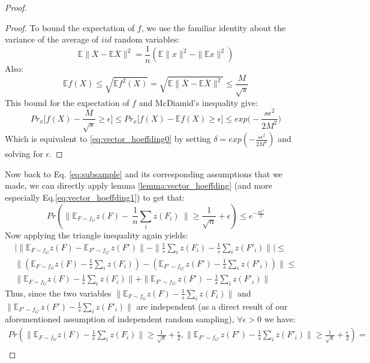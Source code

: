 \begin{proof}
\begin{proof}
To bound the expectation of $f$, we use the familiar identity about the variance of the average of $iid$ random variables:
\begin{equation}
\mathbb{E}\|\overline{X}-\mathbb{E}\overline{X}\|^2=\frac{1}{n}(\mathbb{E}\|x\|^2-\|\mathbb{E}x\|^2 ) 
\end{equation}
Also:
\[ \mathbb{E}f(X)\leq\sqrt{\mathbb{E}f^2(X)}=\sqrt{\mathbb{E}\|\overline{X}-\mathbb{E}\overline{X}\|^2}\leq \frac{M}{\sqrt{{s}}}\]
This bound for the expectation of $f$ and McDiamid's inequality give: 
\begin{equation}
\label{eq:vector_hoeffding1}
    Pr_x \Big [ f(X)-\frac{M}{\sqrt{{s}}}\geq \epsilon \Big ]\leq
    Pr_x \Big [ f(X)-\mathbb{E}f(X)\geq \epsilon \Big ]\leq
    exp\Big( -\frac{{s}\epsilon^2}{2M^2}\Big)
\end{equation}
Which is equivalent to \eqref{eq:vector_hoeffding0} by setting $\delta=exp( -\frac{{s}\epsilon^2}{2M^2})$ and solving for $\epsilon$.
\end{proof}
Now back to Eq. \eqref{eq:subsample} and its corresponding assumptions that we made, we can directly apply lemma \ref{lemma:vector_hoeffding} (and more especially Eq.\eqref{eq:vector_hoeffding1}) to get that:
\begin{equation}
    \label{eq:fixed_w}
    Pr(\|\mathbb{E}_{F \sim f_G} z(F)-~\frac{1}{n} \sum_i z(F_i)~\|\geq \frac{1}{\sqrt{n}}+\epsilon)\leq
    e^{-\frac{n\epsilon^2}{2}}
\end{equation}
Now applying the triangle inequality again yields:
\begin{align*}
    \Big | \| \mathbb{E}_{F \sim f_G} z(F) - \mathbb{E}_{F' \sim f_{G'}} z(F')\| - \| \frac{1}{{s}} \sum_i z(F_i) - \frac{1}{{s}} \sum_i z(F'_i)\|\Big | \leq  \\
   \| (\mathbb{E}_{F \sim f_G} z(F) -  \frac{1}{{s}} \sum_i z(F_i) )- (\mathbb{E}_{F' \sim f_{G'}} z(F') - \frac{1}{{s}} \sum_i z(F'_i))\|\leq \\
    \| \mathbb{E}_{F \sim f_G} z(F) -  \frac{1}{{s}} \sum_i z(F_i) \|+ \|\mathbb{E}_{F' \sim f_{G'}} z(F') - \frac{1}{{s}} \sum_i z(F'_i)\|
\end{align*}
Thus, since the two variables $\| \mathbb{E}_{F \sim f_G} z(F) -  \frac{1}{{s}} \sum_i z(F_i) \|$ and $\|\mathbb{E}_{F' \sim f_{G'}} z(F') - \frac{1}{{s}} \sum_i z(F'_i)\|$ are independent (as a direct result of our aforementioned assumption of independent random sampling), $\forall \epsilon>0$ we have:
\begin{align*}
    Pr( \| \mathbb{E}_{F \sim f_G} z(F) -  \frac{1}{{s}} \sum_i z(F_i) \| \geq \frac{1}{\sqrt{{s}}}+\frac{\epsilon}{2}, \|\mathbb{E}_{F' \sim f_{G'}} z(F') - \frac{1}{{s}} \sum_i z(F'_i)\|\geq\frac{1}{\sqrt{{s}}}+\frac{\epsilon}{2})=\\

\end{align*}
\end{proof}
